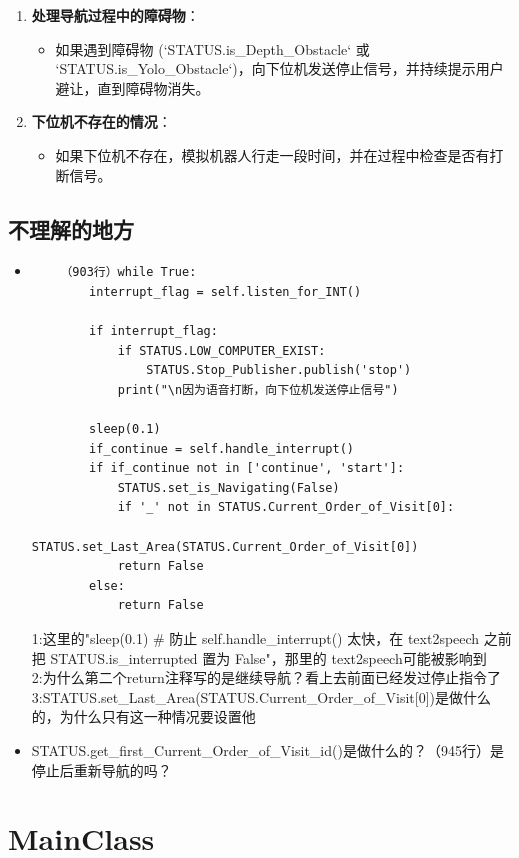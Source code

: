 \documentclass[]{article}
\begin{document}
\begin{enumerate}
	\item \textbf{处理导航过程中的障碍物}：
	\begin{itemize}
		\item 如果遇到障碍物 (`STATUS.is\_Depth\_Obstacle` 或 `STATUS.is\_Yolo\_Obstacle`)，向下位机发送停止信号，并持续提示用户避让，直到障碍物消失。
	\end{itemize}
	
	\item \textbf{下位机不存在的情况}：
	\begin{itemize}
		\item 如果下位机不存在，模拟机器人行走一段时间，并在过程中检查是否有打断信号。
	\end{itemize}
\end{enumerate}
\subsection{\textcolor{mycolor}{不理解的地方}}
\begin{itemize}
	\item \begin{verbatim}
	（903行）while True:
		interrupt_flag = self.listen_for_INT()
	
		if interrupt_flag:
			if STATUS.LOW_COMPUTER_EXIST:
				STATUS.Stop_Publisher.publish('stop')
			print("\n因为语音打断，向下位机发送停止信号")
	
		sleep(0.1)
		if_continue = self.handle_interrupt()
		if if_continue not in ['continue', 'start']:
			STATUS.set_is_Navigating(False)
			if '_' not in STATUS.Current_Order_of_Visit[0]:
				STATUS.set_Last_Area(STATUS.Current_Order_of_Visit[0])
			return False
		else:
			return False
	\end{verbatim}
	1:这里的"sleep(0.1) \# 防止 self.handle\_interrupt() 太快，在 text2speech 
	之前把 STATUS.is\_interrupted 置为 False"，那里的 text2speech可能被影响到\\
	2:为什么第二个return注释写的是继续导航？看上去前面已经发过停止指令了\\
	3:STATUS.set\_Last\_Area(STATUS.Current\_Order\_of\_Visit[0])是做什么的，为什么只有这一种情况要设置他
	\item STATUS.get\_first\_Current\_Order\_of\_Visit\_id()是做什么的？（945行）是停止后重新导航的吗？
\end{itemize}
\section{MainClass}
\end{document}
